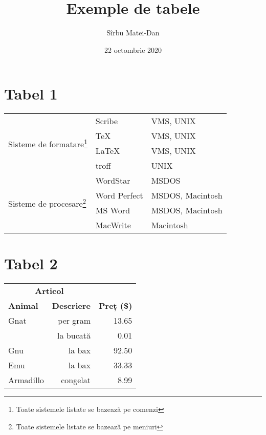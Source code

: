 \documentclass[9pt,a4paper]{article}
\title{\bf Exemple de tabele}
\author{Sîrbu Matei-Dan}
\date{22 octombrie 2020}
\begin{document}
\maketitle

\section*{Tabel 1}

\begin{minipage}{10cm}
    \begin{tabular}{|l|l|l|}
        \hline
        \multirow{4}{*}{Sisteme de formatare\footnote{Toate sistemele listate se bazează pe comenzi}} & Scribe       & VMS, UNIX        \\
        \cline{2-3}                                                                                   & \TeX         & VMS, UNIX        \\
        \cline{2-3}                                                                                   & \LaTeX       & VMS, UNIX        \\
        \cline{2-3}                                                                                   & troff        & UNIX             \\
        \hline
        \multirow{4}{*}{Sisteme de procesare\footnote{Toate sistemele listate se bazează pe meniuri}} & WordStar     & MSDOS            \\
        \cline{2-3}                                                                                   & Word Perfect & MSDOS, Macintosh \\
        \cline{2-3}                                                                                   & MS Word      & MSDOS, Macintosh \\
        \cline{2-3}                                                                                   & MacWrite     & Macintosh        \\
        \hline
    \end{tabular}
\end{minipage}

\section*{Tabel 2}

\begin{tabular}{lrr}
    \hline
    \multicolumn{2}{c}{\bf Articol} &                               \\
    \cline{1-2}
    \bf Animal                      & \bf Descriere & \bf Preț (\$) \\
    \hline
    Gnat                            & per gram      & 13.65         \\
                                    & la bucată     & 0.01          \\
    Gnu                             & la bax        & 92.50         \\
    Emu                             & la bax        & 33.33         \\
    Armadillo                       & congelat      & 8.99          \\
    \hline
\end{tabular}
\end{document}
